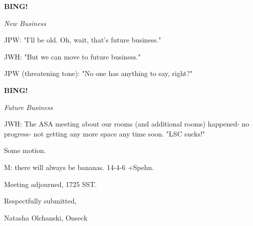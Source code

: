 \documentclass[12pt]{article}
\newcommand{\bing}{{\bf BING!} }
\newcommand{\goto}[1]{\bing \vskip 12pt \centerline{{\em{#1}}}}
\begin{document}
\goto{New Business}

JPW: "I'll be old. Oh, wait, that's future business."

JWH: "But we can move to future business."

JPW (threatening tone): "No one has anything to say, right?"

\goto{Future Business}

JWH: The ASA meeting about our rooms (and additional rooms) happened- no progress- not getting any more space any time soon. "LSC sucks!"

Some motion.

M: there will always be bananas. 14-4-6 +Spehn.

\vspace{12pt}

\noindent
Meeting adjourned, 1725 SST.

\vspace{18pt}

\centerline{Respectfully submitted,}
\centerline{Natasha Olchanski, Onseck}
\end{document}
